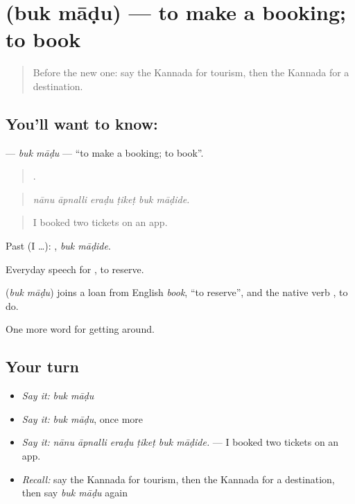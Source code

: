 \section[\texorpdfstring{\kn{ಬುಕ್} \kn{ಮಾಡು} (buk māḍu)}{ಬುಕ್ ಮಾಡು (buk māḍu)}]{  (buk māḍu) — to make a booking; to book}

\label{lesson:KA-C455-buk-madu}



\begin{quote}
Before the new one: say the Kannada for tourism, then the Kannada for a destination.
\end{quote}

\subsection*{You'll want to know:  }
\textbf{ } — \emph{buk māḍu} — \textquotedblleft{}to make a booking; to book\textquotedblright{}.

\begin{quote}
     .
\end{quote}

\begin{quote}
\emph{nānu āpnalli eraḍu ṭikeṭ buk māḍide.}
\end{quote}

\begin{quote}
I booked two tickets on an app.
\end{quote}

Past (I …):  , \emph{buk māḍide}.

Everyday speech for , to reserve.

\begin{cousinweb}
\textbf{ } (\emph{buk māḍu}) joins a loan from English \emph{book}, \textquotedblleft{}to reserve\textquotedblright{}, and the native verb , to do.
\end{cousinweb}

\begin{grammarlens}[title={What you've built}]
One more word for getting around.
\end{grammarlens}

\subsection*{Your turn}
\begin{itemize}
\raggedright
  \item \emph{Say it:} \emph{buk māḍu}
  \item \emph{Say it:} \emph{buk māḍu}, once more
  \item \emph{Say it:} \emph{nānu āpnalli eraḍu ṭikeṭ buk māḍide.} — I booked two tickets on an app.
  \item \emph{Recall:} say the Kannada for tourism, then the Kannada for a destination, then say \emph{buk māḍu} again
\end{itemize}

